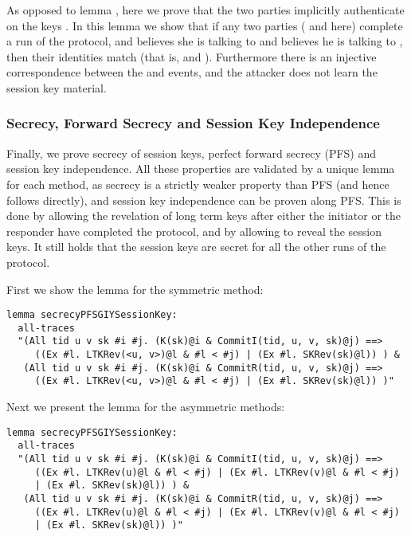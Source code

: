 As opposed to lemma , here we prove that the two
parties implicitly authenticate on the keys . %
In this lemma we show that if any two parties ( and  here) complete
a run of the protocol, and  believes she is talking to  and 
believes he is talking to , then their identities match (that is,
 and ). Furthermore there is an injective correspondence
between the  and  events, and the attacker does not
learn the session key material.

\subsubsection{Secrecy, Forward Secrecy and Session Key Independence}

Finally, we prove secrecy of session keys, perfect forward secrecy
(PFS) and session key independence.
%
All these properties are validated by a unique lemma for each method,
as secrecy is a strictly weaker property than PFS (and hence follows
directly), and session key independence can be proven along PFS.
%
This is done by allowing the revelation of long term keys after either
the initiator or the responder have completed the protocol, and by
allowing to reveal the session keys.
%
It still holds that the session keys are secret for all the other runs
of the protocol.

First we show the lemma for the symmetric method:
\begin{lstlisting}
lemma secrecyPFSGIYSessionKey:
  all-traces
  "(All tid u v sk #i #j. (K(sk)@i & CommitI(tid, u, v, sk)@j) ==>
     ((Ex #l. LTKRev(<u, v>)@l & #l < #j) | (Ex #l. SKRev(sk)@l)) ) &
   (All tid u v sk #i #j. (K(sk)@i & CommitR(tid, u, v, sk)@j) ==>
     ((Ex #l. LTKRev(<u, v>)@l & #l < #j) | (Ex #l. SKRev(sk)@l)) )"
\end{lstlisting}

Next we present the lemma for the asymmetric methods:
\begin{lstlisting}
lemma secrecyPFSGIYSessionKey:
  all-traces
  "(All tid u v sk #i #j. (K(sk)@i & CommitI(tid, u, v, sk)@j) ==>
     ((Ex #l. LTKRev(u)@l & #l < #j) | (Ex #l. LTKRev(v)@l & #l < #j)
     | (Ex #l. SKRev(sk)@l)) ) &
   (All tid u v sk #i #j. (K(sk)@i & CommitR(tid, u, v, sk)@j) ==>
     ((Ex #l. LTKRev(u)@l & #l < #j) | (Ex #l. LTKRev(v)@l & #l < #j)
     | (Ex #l. SKRev(sk)@l)) )"
\end{lstlisting}

